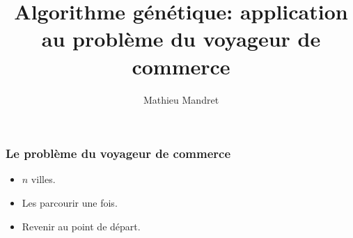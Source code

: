 \documentclass{beamer}
\title{Algorithme génétique: application au problème du voyageur de commerce}
\author{Mathieu Mandret}
\institute{IUT Paul Sabatier}
\begin{document}
\begin{frame}
  \maketitle{}
\end{frame}

\begin{frame}
  \frametitle{Le problème du voyageur de commerce}
  \begin{itemize}
    \item $n$ villes.
    \item Les parcourir une fois.
    \item Revenir au point de départ.
  \end{itemize}

\end{frame}
\end{document}
